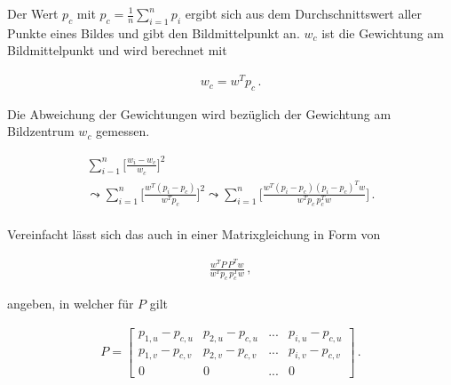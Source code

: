 %
 
Der Wert $p_c$ mit  $p_c = \frac{1}{n} \sum_{i=1}^{n} p_i$ ergibt sich aus dem Durchschnittswert aller Punkte eines Bildes und gibt den Bildmittelpunkt an. $w_c$ ist die Gewichtung am Bildmittelpunkt und wird berechnet mit

\begin{gather}
	w_c = w^Tp_c \, .
\end{gather}


Die Abweichung der Gewichtungen wird bezüglich der Gewichtung am Bildzentrum $w_c$ gemessen. 

\begin{gather}
	\sum_{i-1}^{n}\Big[\frac{w_i-w_c}{w_c} \Big]^2\\
	\leadsto \sum_{i=1}^{n}\Big[\frac{w^T (p_i-p_c)}{w^Tp_c} \Big]^2
	\leadsto \sum_{i=1}^{n}\Big[\frac{w^T (p_i-p_c)(p_i-p_c)^Tw}{w^Tp_c \, p_c^Tw} \Big]\, .
\end{gather}\\

%

Vereinfacht lässt sich das auch in einer Matrixgleichung in Form von

\begin{gather}
	\frac{w^TP \, P^Tw}{w^Tp_c \, p_c^Tw} \, , \label{eq:MinimizationBild1}
\end{gather}

angeben, in welcher für $P$ gilt

\begin{gather}
	P=\begin{bmatrix}
		p_{1,u}-p_{c,u}&p_{2,u}-p_{c,u}&...&p_{i,u}-p_{c,u}\\
		p_{1,v}-p_{c,v}&p_{2,v}-p_{c,v}&...&p_{i,v}-p_{c,v}\\\label{eq:P}
		0&0&...&0	
	\end{bmatrix} \, .
\end{gather}

